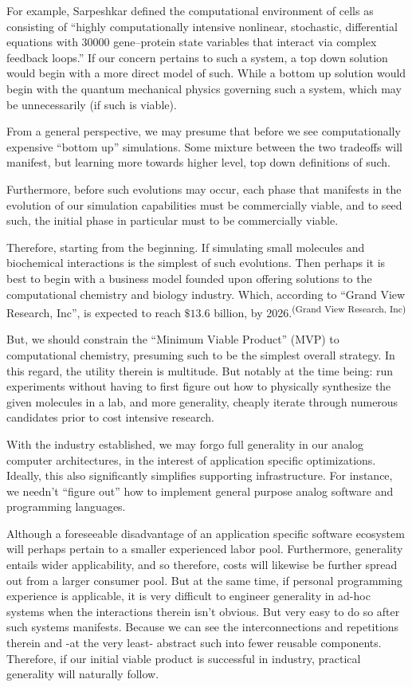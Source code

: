 For example, Sarpeshkar defined the computational environment of cells as consisting of ``highly computationally intensive nonlinear, stochastic, differential equations with $30000$ gene–protein state variables that interact via complex feedback loops.'' If our concern pertains to such a system, a top down solution would begin with a more direct model of such. While a bottom up solution would begin with the quantum mechanical physics governing such a system, which may be unnecessarily (if such is viable).

From a general perspective, we may presume that before we see computationally expensive ``bottom up'' simulations. Some mixture between the two tradeoffs will manifest, but learning more towards higher level, top down definitions of such.

Furthermore, before such evolutions may occur, each phase that manifests in the evolution of our simulation capabilities must be commercially viable, and to seed such, the initial phase in particular must to be commercially viable.

Therefore, starting from the beginning. If simulating small molecules and biochemical interactions is the simplest of such evolutions. Then perhaps it is best to begin with a business model founded upon offering solutions to the computational chemistry and biology industry. Which, according to ``Grand View Research, Inc'', is expected to reach $\$13.6$ billion, by 2026.\textsuperscript{(Grand View Research, Inc)}

But, we should constrain the ``Minimum Viable Product'' (MVP) to computational chemistry, presuming such to be the simplest overall strategy. In this regard, the utility therein is multitude. But notably at the time being: run experiments without having to first figure out how to physically synthesize the given molecules in a lab, and more generality, cheaply iterate through numerous candidates prior to cost intensive research. 

With the industry established, we may forgo full generality in our analog computer architectures, in the interest of application specific optimizations. Ideally, this also significantly simplifies supporting infrastructure. For instance, we needn't ``figure out'' how to implement general purpose analog software and programming languages.

Although a foreseeable disadvantage of an application specific software ecosystem will perhaps pertain to a smaller experienced labor pool. Furthermore, generality entails wider applicability, and so therefore, costs will likewise be further spread out from a larger consumer pool. But at the same time, if personal programming experience is applicable, it is very difficult to engineer generality in ad-hoc systems when the interactions therein isn't obvious. But very easy to do so after such systems manifests. Because we can see the interconnections and repetitions therein and -at the very least- abstract such into fewer reusable components. Therefore, if our initial viable product is successful in industry, practical generality will naturally follow.

